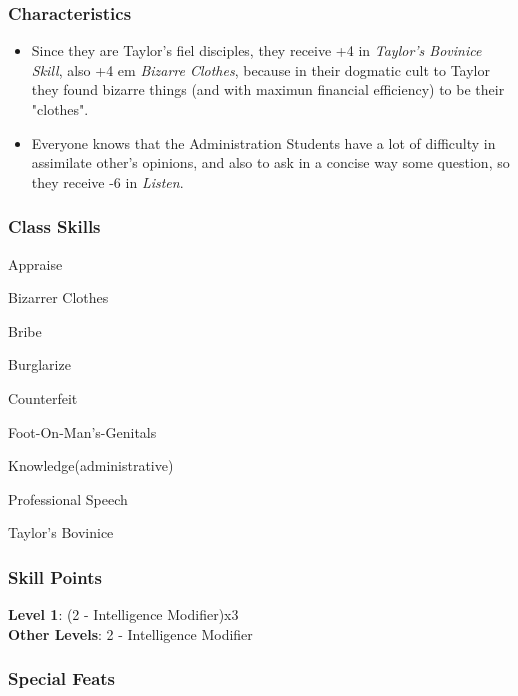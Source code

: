 \documentclass[ letterpaper,12pt]{article}
\begin{document}
\subsubsection{Characteristics}
\begin{itemize}
\item{Since they are Taylor's fiel disciples, they receive +4 in {\it Taylor's Bovinice Skill}, also +4 em {\it Bizarre Clothes}, because in their dogmatic cult to Taylor they found bizarre things (and with maximun financial efficiency) to be their "clothes".}
\item{Everyone knows that the Administration Students have a lot of difficulty in assimilate other's opinions, and also to ask in a concise way some question, so they receive -6 in {\it Listen}.}
\end{itemize}

\subsubsection{Class Skills}
\begin{itemize}
{\it
\item{Appraise}
\item{Bizarrer Clothes}
\item{Bribe}
\item{Burglarize}
\item{Counterfeit}
\item{Foot-On-Man's-Genitals}
\item{Knowledge(administrative)}
\item{Professional Speech}
\item{Taylor's Bovinice}
}
\end{itemize}

\subsubsection{Skill Points}
{\bf Level 1}: (2 - Intelligence Modifier)x3\\
{\bf Other Levels}: 2 - Intelligence Modifier\\

\subsubsection{Special Feats}
\end{document}
